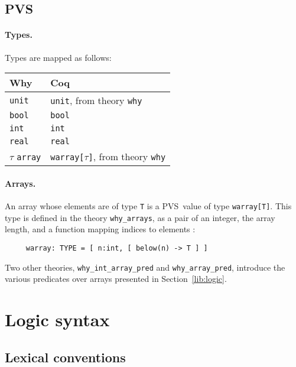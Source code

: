 \documentclass[a4paper,12pt]{report}
\makeatletter
\newcommand{\pvs}{\textsf{PVS}\index{PVS@\textsf{PVS}}}
\newcommand{\coq}{\textsf{Coq}\index{Coq@\textsf{Coq}}}
\newcommand{\why}{\textsf{Why}}
\makeatother
\begin{document}
\subsection{PVS}
\label{lib:pvs}

\paragraph{Types.} 
Types are mapped as follows:
\begin{center}
  \begin{tabular}{|l|l|}
    \hline
    \why & \coq \\
    \hline
    \texttt{unit} & \texttt{unit}, from theory \texttt{why} \\
    \hline
    \texttt{bool} & \texttt{bool} \\
    \hline
    \texttt{int} & \texttt{int} \\
    \hline
    \texttt{real} & \texttt{real} \\
    \hline
    $\tau$ \texttt{array} & \texttt{warray[$\tau$]},
                            from theory \texttt{why} \\
    \hline
  \end{tabular}
\end{center}

\paragraph{Arrays.} An array whose elements are of type \texttt{T} is a
\pvs\ value of type \texttt{warray[T]}. This type is defined in the
theory \texttt{why\_arrays}, as
a pair of an integer, the array length, and a function mapping
indices to elements :
\begin{verbatim}
     warray: TYPE = [ n:int, [ below(n) -> T ] ]
\end{verbatim}
Two other theories, \texttt{why\_int\_array\_pred} and
\texttt{why\_array\_pred}, introduce the various predicates over
arrays presented in Section~\ref{lib:logic}.


\section{Logic syntax}
\label{syntax:logic}


\subsection{Lexical conventions}
\label{lexical:logic}
\end{document}

